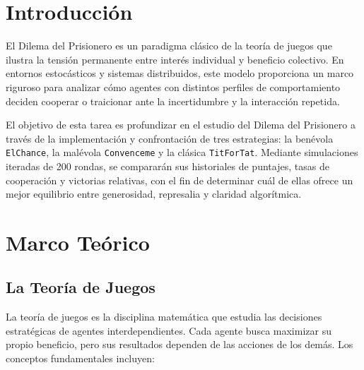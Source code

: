 \documentclass{article}
\begin{document}


\section{Introducción}\label{sec:intr}

El Dilema del Prisionero es un paradigma clásico de la teoría de juegos que ilustra 
la tensión permanente entre interés individual y beneficio colectivo. 
En entornos estocásticos y sistemas distribuidos, este modelo proporciona un marco riguroso 
para analizar cómo agentes con distintos perfiles de comportamiento deciden cooperar o traicionar 
ante la incertidumbre y la interacción repetida.

El objetivo de esta tarea es profundizar en el estudio del Dilema del Prisionero a través 
de la implementación y confrontación de tres estrategias: la benévola \texttt{ElChance}, la 
malévola \texttt{Convenceme} y la clásica \texttt{TitForTat}. Mediante simulaciones iteradas 
de 200 rondas, se compararán sus historiales de puntajes, tasas de cooperación y 
victorias relativas, con el fin de determinar cuál de ellas ofrece un mejor 
equilibrio entre generosidad, represalia y claridad algorítmica.


\section{Marco Teórico}\label{sec:marc}


\subsection{La Teoría de Juegos}
La teoría de juegos es la disciplina matemática que estudia las decisiones estratégicas de 
agentes interdependientes. Cada agente busca maximizar su propio beneficio, pero sus resultados 
dependen de las acciones de los demás. Los conceptos fundamentales incluyen:
\end{document}
